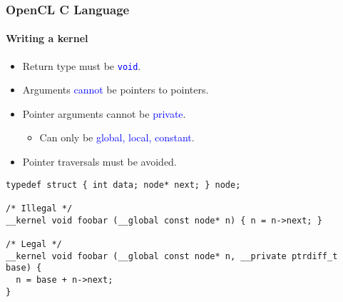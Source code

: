 \documentclass{beamer}
\newcommand{\code}[1]{\lstinline[basicstyle=\sffamily]{#1}}
\begin{document}
\begin{frame}[fragile]
\frametitle{OpenCL C Language}
\framesubtitle{Writing a kernel}

  \begin{itemize}
  \item Return type must be \textcolor{blue}{\code{void}}.
  \item Arguments \textcolor{blue}{cannot} be pointers to pointers.
  \item Pointer arguments cannot be \textcolor{blue}{private}.
    \begin{itemize}
    \item Can only be \textcolor{blue}{global, local, constant}.
    \end{itemize}
  \item Pointer traversals must be avoided.
  \end{itemize}

\begin{center}
\begin{minipage}{0.7\textwidth}
  \begin{lstlisting}
typedef struct { int data; node* next; } node;

/* Illegal */
__kernel void foobar (__global const node* n) { n = n->next; }

/* Legal */
__kernel void foobar (__global const node* n, __private ptrdiff_t base) {
  n = base + n->next; 
}
  \end{lstlisting}
\end{minipage}
\end{center}

\end{frame}
\end{document}
